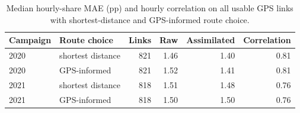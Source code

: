 \begin{table}[htbp]\centering
\caption{Median hourly-share MAE (pp) and hourly correlation on all usable GPS links with shortest-distance and GPS-informed route choice.}
\label{tab:routing_shape}
\begin{tabular}{@{}llrrrr@{}}\toprule
Campaign & Route choice & Links & Raw & Assimilated & Correlation \\\midrule
2020 & shortest distance & 821 & 1.46 & 1.40 & 0.81 \\
2020 & GPS-informed & 821 & 1.52 & 1.41 & 0.81 \\
2021 & shortest distance & 818 & 1.51 & 1.48 & 0.76 \\
2021 & GPS-informed & 818 & 1.50 & 1.50 & 0.76 \\
\bottomrule\end{tabular}\end{table}

